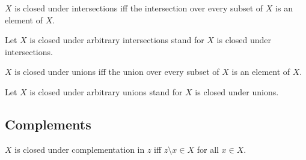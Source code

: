 \documentclass[../../basic-notions.ftl.tex]{subfiles}
\begin{document}
  \begin{forthel}
    \begin{definition}
      $X$ is closed under intersections iff the intersection over every subset of $X$ is an element of $X$.
    \end{definition}

    Let $X$ is closed under arbitrary intersections stand for $X$ is closed under intersections.

    \begin{definition}
      $X$ is closed under unions iff the union over every subset of $X$ is an element of $X$.
    \end{definition}

    Let $X$ is closed under arbitrary unions stand for $X$ is closed under unions.
  \end{forthel}


  \subsection{Complements}

  \begin{forthel}
    \begin{definition}
      $X$ is closed under complementation in $z$ iff $z \setminus x \in X$ for all $x \in X$.
    \end{definition}
  \end{forthel}
\end{document}
